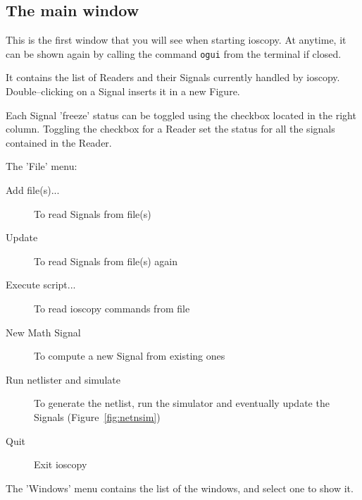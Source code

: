 \documentclass[a4paper,11pt]{article}
\begin{document}
\subsection{The main window}
This is the first window that you will see when starting ioscopy.
At anytime, it can be shown again by calling the command \texttt{ogui} from the terminal if closed.

It contains the list of Readers and their Signals currently handled by ioscopy.
Double--clicking on a Signal inserts it in a new Figure.

Each Signal 'freeze' status can be toggled using the checkbox located in the right column.
Toggling the checkbox for a Reader set the status for all the signals contained in the Reader.

The 'File' menu:
\begin{description}
\item[Add file(s)...] To read Signals from file(s)
\item[Update] To read Signals from file(s) again
\item[Execute script...] To read ioscopy commands from file
\item[New Math Signal] To compute a new Signal from existing ones
\item[Run netlister and simulate] To generate the netlist, run the simulator and eventually update the Signals (Figure~\ref{fig:netnsim})
\item[Quit] Exit ioscopy
\end{description}

\noindent The 'Windows' menu contains the list of the windows, and select one to show it.

\end{document}
